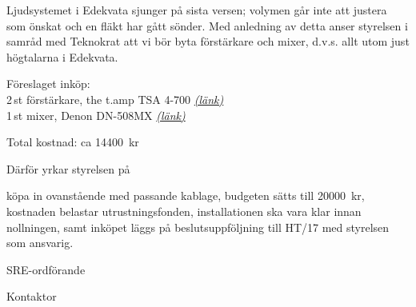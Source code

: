 \documentclass[../_main/handlingar.tex]{subfiles}
\begin{document}

Ljudsystemet i Edekvata sjunger på sista versen; volymen går inte att justera som önskat och en fläkt har gått sönder. Med anledning av detta anser styrelsen i samråd med Teknokrat att vi bör byta förstärkare och mixer, d.v.s. allt utom just högtalarna i Edekvata.

Föreslaget inköp:\\
2\,st förstärkare, the t.amp TSA 4-700 \href{https://www.thomann.de/se/the_tamp_tsa_4700.htm}{\textit{(länk)}}\\
1\,st mixer, Denon DN-508MX \href{https://www.thomann.de/se/denon_dn_508mx.htm}{\textit{(länk)}}

Total kostnad: ca \SI{14400}{kr}

Därför yrkar styrelsen på

\begin{attsatser}
    \att köpa in ovanstående med passande kablage,
    \att budgeten sätts till \SI{20000}{kr},
    \att kostnaden belastar utrustningsfonden,
    \att installationen ska vara klar innan nollningen, samt
    \att inköpet läggs på beslutsuppföljning till HT/17 med styrelsen som ansvarig.
\end{attsatser}

\begin{signatures}{2}
    \ist
    \signature{\sreordf}{SRE-ordförande}
    \signature{\sekr}{Kontaktor}
\end{signatures}
\end{document}
